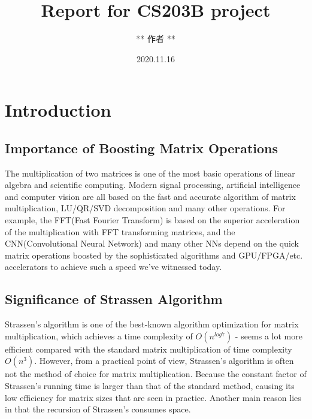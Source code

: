 \documentclass[UTF8]{ctexart}
\begin{document}
\title{\textbf{Report for CS203B project}}
\author{** 作者 **}
\date{2020.11.16}
\maketitle
\tableofcontents

\section{Introduction}
\label{sec::Intro}
\subsection{Importance of Boosting Matrix Operations}
\label{subsec::IBMO}
The multiplication of two matrices is one of the most basic operations of linear algebra and scientific computing. Modern signal processing, artificial intelligence and computer vision are all based on the fast and accurate algorithm of matrix multiplication, LU/QR/SVD decomposition and many other operations. For example, the FFT(Fast Fourier Transform) is based on the superior acceleration of the multiplication with FFT transforming matrices, and the CNN(Convolutional Neural Network) and many other NNs depend on the quick matrix operations boosted by the sophisticated algorithms and GPU/FPGA/etc. accelerators to achieve such a speed we've witnessed today.

\subsection{Significance of Strassen Algorithm}
\label{subsec::SoSAl}
Strassen's algorithm is one of the best-known algorithm optimization for matrix multiplication, which achieves a time complexity of $O(n^{log7})$ - seems a lot more efficient compared with the standard matrix multiplication of time complexity $O(n^3)$. However, from a practical point of view, Strassen's algorithm is often not the method of choice for matrix multiplication. Because the constant factor of Strassen's running time is larger than that of the standard method, causing its low efficiency for matrix sizes that are seen in practice. Another main reason lies in that the recursion of Strassen's consumes space.
\end{document}
